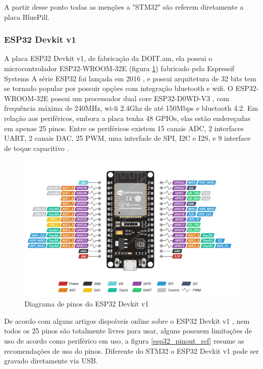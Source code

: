 A partir desse ponto todas as menções a "STM32" são referem diretamente a  placa BluePill.


\subsubsection{ESP32 Devkit v1}

A placa ESP32 Devkit v1, de fabricação da DOIT.am, ela possui o microcontrolador ESP32-WROOM-32E (figura \ref{esp32_pinout}) fabricado pela Espressif Systems
A série ESP32 foi lançada em 2016 \cite{anuncio_esp32}, e possui arquitetura de 32 bits
tem se tornado popular por possuir opções com integração bluetooth e wifi.
O ESP32-WROOM-32E possui um processador dual core ESP32-D0WD-V3 \cite{esp32_wroom_32e_datasheet}, com frequência máxima de 240MHz, wi-fi 2.4Ghz de até 150Mbps e
bluetooth 4.2. Em relação aos periféricos, embora a placa tenha 48 GPIOs, elas estão endereçadas em apenas 25 pinos.
Entre os periféricos existem 15 canais ADC, 2 interfaces UART, 
2 canais DAC, 25 PWM, uma interfade de SPI, I2C e I2S, e 9 interface de toque capacitivo \cite{esp32_reference_2} \cite{esp32_reference}.

\begin{figure}[ht]
	\centering
	\includegraphics[width=1.0\textwidth]{figures/esp32_pinout}
	\caption{Diagrama de pinos do ESP32 Devkit v1 \cite{esp32_reference}}
	\label{esp32_pinout}
\end{figure}

De acordo com alguns artigos dispoíveis online sobre o ESP32 Devkit v1  \cite{esp32_reference_2} \cite{esp32_reference},
nem todos os 25 pinos são totalmente livres para usar,
alguns possuem limitações de uso de acordo como periférico em uso, a figura \ref{esp32_pinout_ref} resume as recomendações de uso do pinos.
Diferente do STM32 o ESP32 Devkit v1 pode ser gravado diretamente via USB.

